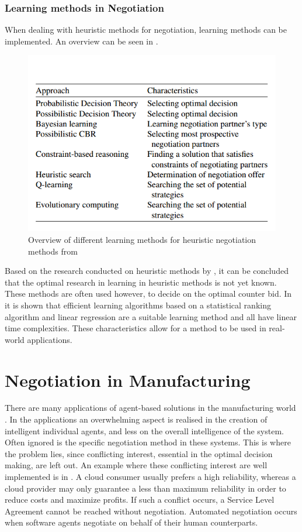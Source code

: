 \subsubsection{Learning methods in Negotiation}
When dealing with heuristic methods for negotiation, learning methods can be implemented. An overview can be seen in . 
\begin{figure}
\centering
\includegraphics[width=0.7\linewidth]{img/negotiation_learning}
\caption{Overview of different learning methods for heuristic negotiation methods from \citet{beheshti2014homan}}
\label{fig:negotiationlearning}
\end{figure}
Based on the research conducted on heuristic methods by \citet{jennings2001automated}, it can be concluded that the optimal research in learning in heuristic methods is not yet known. These methods are often used however, to decide on the optimal counter bid. In \citep{beheshti2014homan} it is shown that efficient learning algorithms based on a statistical ranking algorithm and linear regression are a suitable learning method and all have linear time complexities. These characteristics allow for a method to be used in real-world applications. 
\section{Negotiation in Manufacturing}
There are many applications of agent-based solutions in the manufacturing world \citep{monostori2006agent}. In the applications an overwhelming aspect is realised in the creation of intelligent individual agents, and less on the overall intelligence of the system. Often ignored is the specific negotiation method in these systems. This is where the problem lies, since conflicting interest, essential in the optimal decision making, are left out. An example where these conflicting interest are well implemented is in \citep{zheng2014cloud}. A cloud consumer usually prefers a high reliability, whereas a cloud provider may only guarantee a less than maximum reliability in order to reduce costs and maximize profits. If such a conflict occurs, a Service Level Agreement cannot be reached without negotiation. Automated negotiation occurs when software agents negotiate on behalf of their human counterparts.  

